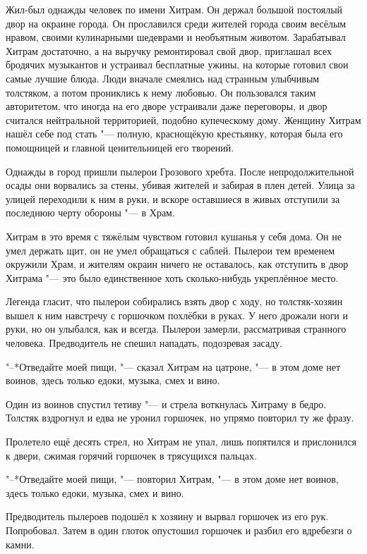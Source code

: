 \documentclass[a4paper,10pt]{book}
\begin{document}
Жил-был однажды человек по имени Хитрам. Он держал большой постоялый двор на 
окраине города. Он прославился среди жителей города своим весёлым нравом, 
своими кулинарными шедеврами и необъятным животом. Зарабатывал Хитрам 
достаточно, а на выручку ремонтировал свой двор, приглашал всех бродячих 
музыкантов и устраивал бесплатные ужины, на которые готовил свои самые лучшие 
блюда. Люди вначале смеялись над странным улыбчивым толстяком, а потом 
прониклись к нему любовью. Он пользовался таким авторитетом, что иногда на его 
дворе устраивали даже переговоры, и двор считался нейтральной территорией, 
подобно купеческому дому. Женщину Хитрам нашёл себе под стать "--- полную, 
краснощёкую крестьянку, которая была его помощницей и главной ценительницей его 
творений.

Однажды в город пришли пылерои Грозового хребта. После непродолжительной осады 
они ворвались за стены, убивая жителей и забирая в плен детей. Улица за улицей 
переходили к ним в руки, и вскоре оставшиеся в живых отступили за последнюю 
черту обороны "--- в Храм.

Хитрам в это время с тяжёлым чувством готовил кушанья у себя дома. Он не умел 
держать щит, он не умел обращаться с саблей. Пылерои тем временем окружили 
Храм, и жителям окраин ничего не оставалось, как отступить в двор Хитрама "--- 
это было единственное хоть сколько-нибудь укреплённое место.

Легенда гласит, что пылерои собирались взять двор с ходу, но толстяк-хозяин 
вышел к ним навстречу с горшочком похлёбки в руках. У него дрожали ноги и руки, 
но он улыбался, как и всегда. Пылерои замерли, рассматривая странного человека. 
Предводитель не спешил нападать, подозревая засаду.

"--*Отведайте моей пищи, "--- сказал Хитрам на цатроне, "--- в этом доме нет 
воинов, здесь только едоки, музыка, смех и вино.

Один из воинов спустил тетиву "--- и стрела воткнулась Хитраму в бедро. Толстяк 
вздрогнул и едва не уронил горшочек, но упрямо повторил ту же фразу.

Пролетело ещё десять стрел, но Хитрам не упал, лишь попятился и прислонился к 
двери, сжимая горячий горшочек в трясущихся пальцах.

"--*Отведайте моей пищи, "--- повторил Хитрам, "--- в этом доме нет воинов, 
здесь 
только едоки, музыка, смех и вино.

Предводитель пылероев подошёл к хозяину и вырвал горшочек из его рук. 
Попробовал. Затем в один глоток опустошил горшочек и разбил его вдребезги о 
камни.
\end{document}
